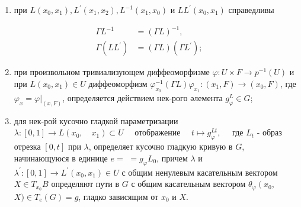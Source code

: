 \documentclass[10pt]{article}
\begin{document}
\begin{enumerate}

  \item при $L\left(x_{0}, x_{1}\right), L^{\prime}\left(x_{1}, x_{2}\right), L^{-1}\left(x_{1}, x_{0}\right)$ и $L L^{\prime}\left(x_{0}, x_{1}\right)$ справедливы

\end{enumerate}



\[

\begin{aligned}

\Gamma L^{-1} & =(\Gamma L)^{-1}, \\

\Gamma\left(L L^{\prime}\right) & =(\Gamma L)\left(\Gamma L^{\prime}\right) ;

\end{aligned}

\]



\begin{enumerate}

  \setcounter{enumi}{1}

  \item при произвольном тривиализующем диффеоморфизме $\varphi: U \times F \rightarrow p^{-1}(U)$ и при $L\left(x_{0}, x_{1}\right) \in U$ диффеоморфизм $\varphi_{x_{0}}^{-1}(\Gamma L) \varphi_{x_{1}}:\left(x_{1}, F\right) \rightarrow\left(x_{0}, F\right)$, где $\varphi_{x}=\left.\varphi\right|_{(x, F)}$, определяется действием нек-рого әлемента $g_{\varphi}^{L} \in G$;



  \item для нек-рой кусочно гладкой параметризации $\lambda:[0,1] \rightarrow L\left(x_{0}, \quad x_{1}\right) \subset U \quad$ отображение $\quad t \mapsto g_{\varphi}^{L t}, \quad$ где $L_{t}$ - образ отрезка $[0, t]$ при $\lambda$, определяет кусочно гладкую кривую в $G$, начинающуюся в единице $e=$ $=g_{\varphi} L_{0}$, причем $\lambda$ и $\lambda^{\prime}:[0,1] \rightarrow L^{\prime}\left(x_{0}, x_{1}\right) \in U$ с общим ненулевым касательным вектором $X \in T_{x_{0}} B$ определяют пути в $G$ с общим касательным вектором $\theta_{\varphi}\left(x_{0}\right.$, $X) \in T_{e}(G)=g$, гладко зависящим от $x_{0}$ и $X$.



\end{enumerate}
\end{document}

